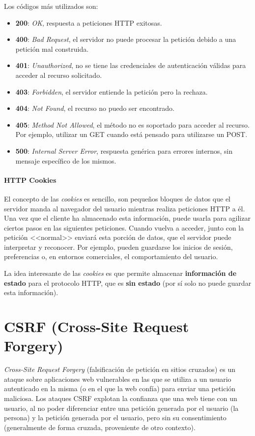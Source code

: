Los códigos más utilizados son:

\begin{itemize}
	\item \textbf{200}: \emph{OK}, respuesta a peticiones HTTP exitosas.
  \item \textbf{400}: \emph{Bad Request}, el servidor no puede procesar la petición
  debido a una petición mal construida.
  \item \textbf{401}: \emph{Unauthorized}, no se tiene las credenciales de
  autenticación válidas para acceder al recurso solicitado.
  \item \textbf{403}: \emph{Forbidden}, el servidor entiende la petición pero la
  rechaza.
  \item \textbf{404}: \emph{Not Found}, el recurso no puedo ser encontrado.
  \item \textbf{405}: \emph{Method Not Allowed}, el método no es soportado para acceder
  al recurso. Por ejemplo, utilizar un GET cuando está pensado para utilizarse
  un POST.
  \item \textbf{500}: \emph{Internal Server Error}, respuesta genérica para errores
  internos, sin mensaje específico de los mismos.
\end{itemize}

\paragraph{HTTP Cookies}

El concepto de las \textit{cookies} es sencillo, son pequeños bloques de datos
que el servidor manda al navegador del usuario mientras realiza peticiones HTTP
a él. Una vez que el cliente ha almacenado esta información, puede usarla para
agilizar ciertos pasos en las siguientes peticiones. Cuando vuelva a acceder,
junto con la petición <<normal>> enviará esta porción de datos, que el servidor
puede interpretar y reconocer. Por ejemplo, pueden guardarse los inicios de
sesión, preferencias o, en entornos comerciales, el comportamiento del usuario.

La idea interesante de las \textit{cookies} es que permite almacenar
\textbf{información de estado} para el protocolo HTTP, que es \textbf{sin
estado} (por sí solo no puede guardar esta información).

\section{CSRF (Cross-Site Request Forgery)}
\emph{Cross-Site Request Forgery} (falsificación de petición en sitios cruzados)
es un ataque sobre aplicaciones web vulnerables en las que se utiliza a un
usuario autenticado en la misma (o en el que la web confía) para enviar una
petición maliciosa. Los ataques CSRF explotan la confianza que una web tiene con
un usuario, al no poder diferenciar entre una petición generada por el usuario
(la persona) y la petición generada por el usuario, pero sin su consentimiento
\cite{csrf} (generalmente de forma cruzada, proveniente de otro contexto).

